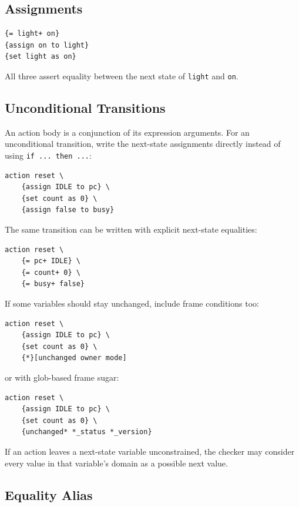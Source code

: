 \documentclass[11pt]{article}
\begin{document}
\subsection{Assignments}

\begin{lstlisting}[language=TDSTR]
{= light+ on}
{assign on to light}
{set light as on}
\end{lstlisting}

All three assert equality between the next state of \texttt{light} and
\texttt{on}.

\subsection{Unconditional Transitions}

An action body is a conjunction of its expression arguments.  For an
unconditional transition, write the next-state assignments directly instead of
using \texttt{if ... then ...}:

\begin{lstlisting}[language=TDSTR]
action reset \
    {assign IDLE to pc} \
    {set count as 0} \
    {assign false to busy}
\end{lstlisting}

The same transition can be written with explicit next-state equalities:

\begin{lstlisting}[language=TDSTR]
action reset \
    {= pc+ IDLE} \
    {= count+ 0} \
    {= busy+ false}
\end{lstlisting}

If some variables should stay unchanged, include frame conditions too:

\begin{lstlisting}[language=TDSTR]
action reset \
    {assign IDLE to pc} \
    {set count as 0} \
    {*}[unchanged owner mode]
\end{lstlisting}

or with glob-based frame sugar:

\begin{lstlisting}[language=TDSTR]
action reset \
    {assign IDLE to pc} \
    {set count as 0} \
    {unchanged* *_status *_version}
\end{lstlisting}

If an action leaves a next-state variable unconstrained, the checker may
consider every value in that variable's domain as a possible next value.

\subsection{Equality Alias}
\end{document}
